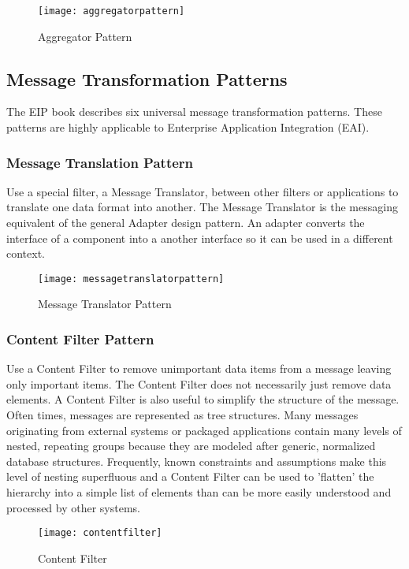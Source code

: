\begin{figure}[H]
  \center
  \texttt{[image: aggregatorpattern]}
  \caption{Aggregator Pattern}
\end{figure}

\pagebreak

\subsection{Message Transformation Patterns}
The EIP book describes six universal message transformation patterns. These patterns are highly applicable to Enterprise Application Integration (EAI).

\subsubsection{Message Translation Pattern}
Use a special filter, a Message Translator, between other filters or applications to translate one data format into another. The Message Translator is the messaging equivalent of the general Adapter design pattern. An adapter converts the interface of a component into a another interface so it can be used in a different context.

\begin{figure}[H]
  \center
  \texttt{[image: messagetranslatorpattern]}
  \caption{Message Translator Pattern}
\end{figure}

\subsubsection{Content Filter Pattern}
Use a Content Filter to remove unimportant data items from a message leaving only important items. The Content Filter does not necessarily just remove data elements. A Content Filter is also useful to simplify the structure of the message. Often times, messages are represented as tree structures. Many messages originating from external systems or packaged applications contain many levels of nested, repeating groups because they are modeled after generic, normalized database structures. Frequently, known constraints and assumptions make this level of nesting superfluous and a Content Filter can be used to 'flatten' the hierarchy into a simple list of elements than can be more easily understood and processed by other systems.

\begin{figure}[H]
  \center
  \texttt{[image: contentfilter]}
  \caption{Content Filter}
\end{figure}


